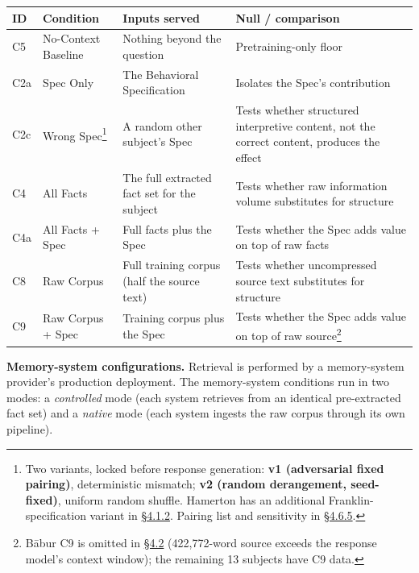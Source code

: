 \begin{longtable}[]{@{}
  >{\raggedright\arraybackslash}p{}
  >{\raggedright\arraybackslash}p{}
  >{\raggedright\arraybackslash}p{}
  >{\raggedright\arraybackslash}p{}@{}}
\toprule
ID & Condition & Inputs served & Null / comparison \\
\midrule
\endhead
C5 & No-Context Baseline & Nothing beyond the question &
Pretraining-only floor \\
C2a & Spec Only & The Behavioral Specification & Isolates the Spec's
contribution \\
C2c & Wrong Spec\footnote{Two variants, locked before response
  generation: \textbf{v1 (adversarial fixed pairing)}, deterministic
  mismatch; \textbf{v2 (random derangement, seed-fixed)}, uniform random
  shuffle. Hamerton has an additional Franklin-specification variant in
  \hyperref[the-gradient-at-the-high-baseline-end-franklin-reference]{§4.1.2}. Pairing list and sensitivity in
  \hyperref[wrong-spec-derangement-protocol-sensitivity]{§4.6.5}.} & A
random other subject's Spec & Tests whether structured interpretive
content, not the correct content, produces the effect \\
C4 & All Facts & The full extracted fact set for the subject & Tests
whether raw information volume substitutes for structure \\
C4a & All Facts + Spec & Full facts plus the Spec & Tests whether the
Spec adds value on top of raw facts \\
C8 & Raw Corpus & Full training corpus (half the source text) & Tests
whether uncompressed source text substitutes for structure \\
C9 & Raw Corpus + Spec & Training corpus plus the Spec & Tests whether
the Spec adds value on top of raw source\footnote{Bābur C9 is omitted in
  \hyperref[compression-structure-vs.-raw-text]{§4.2} (422,772-word source exceeds the response model's context
  window); the remaining 13 subjects have C9 data.} \\
\bottomrule
\end{longtable}

\textbf{Memory-system configurations.} Retrieval is performed by a
memory-system provider's production deployment. The memory-system
conditions run in two modes: a \emph{controlled} mode (each system
retrieves from an identical pre-extracted fact set) and a \emph{native}
mode (each system ingests the raw corpus through its own pipeline).

